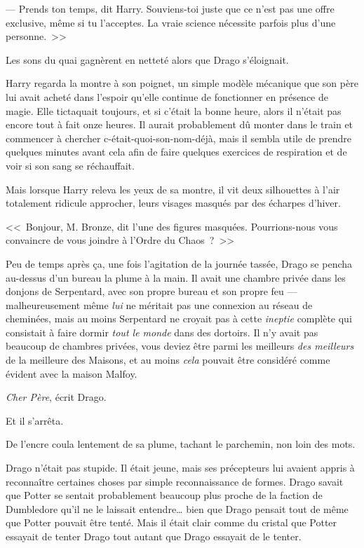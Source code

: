 --- Prends ton temps, dit Harry. Souviens-toi juste que ce n'est pas une offre exclusive, même si tu l'acceptes. La vraie science nécessite parfois plus d'une personne.~>>

Les sons du quai gagnèrent en netteté alors que Drago s'éloignait.

Harry regarda la montre à son poignet, un simple modèle mécanique que son père lui avait acheté dans l'espoir qu'elle continue de fonctionner en présence de magie. Elle tictaquait toujours, et si c'était la bonne heure, alors il n'était pas encore tout à fait onze heures. Il aurait probablement dû monter dans le train et commencer à chercher c-était-quoi-son-nom-déjà, mais il sembla utile de prendre quelques minutes avant cela afin de faire quelques exercices de respiration et de voir si son sang se réchauffait.

Mais lorsque Harry releva les yeux de sa montre, il vit deux silhouettes à l'air totalement ridicule approcher, leurs visages masqués par des écharpes d'hiver.

<<~Bonjour, M. Bronze, dit l'une des figures masquées. Pourrions-nous vous convaincre de vous joindre à l'Ordre du Chaos~?~>>


Peu de temps après ça, une fois l'agitation de la journée tassée, Drago se pencha au-dessus d'un bureau la plume à la main. Il avait une chambre privée dans les donjons de Serpentard, avec son propre bureau et son propre feu — malheureusement même \emph{lui} ne méritait pas une connexion au réseau de cheminées, mais au moins Serpentard ne croyait pas à cette \emph{ineptie} complète qui consistait à faire dormir \emph{tout le monde} dans des dortoirs. Il n'y avait pas beaucoup de chambres privées, vous deviez être parmi les meilleurs \emph{des meilleurs} de la meilleure des Maisons, et au moins \emph{cela} pouvait être considéré comme évident avec la maison Malfoy.

\emph{Cher Père}, écrit Drago.

Et il s'arrêta.

De l'encre coula lentement de sa plume, tachant le parchemin, non loin des mots.

Drago n'était pas stupide. Il était jeune, mais ses précepteurs lui avaient appris à reconnaître certaines choses par simple reconnaissance de formes. Drago savait que Potter se sentait probablement beaucoup plus proche de la faction de Dumbledore qu'il ne le laissait entendre… bien que Drago pensait tout de même que Potter pouvait être tenté. Mais il était clair comme du cristal que Potter essayait de tenter Drago tout autant que Drago essayait de le tenter.

